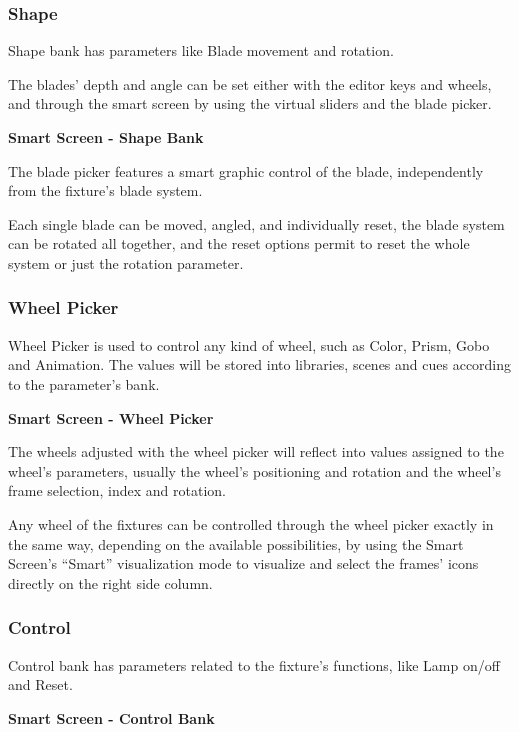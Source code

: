 \documentclass[
]{article}
\begin{document}
\hypertarget{shape}{%
\subsubsection{Shape}\label{shape}}

Shape bank has parameters like Blade movement and rotation.

The blades' depth and angle can be set either with the editor keys and wheels, and through the smart screen by using the virtual sliders and the blade picker.

\textbf{Smart Screen - Shape Bank}

The blade picker features a smart graphic control of the blade, independently from the fixture's blade system.

Each single blade can be moved, angled, and individually reset, the blade system can be rotated all together, and the reset options permit to reset the whole system or just the rotation parameter.

\hypertarget{wheel-picker}{%
\subsubsection{Wheel Picker}\label{wheel-picker}}

Wheel Picker is used to control any kind of wheel, such as Color, Prism, Gobo and Animation.
The values will be stored into libraries, scenes and cues according to the parameter's bank.

\textbf{Smart Screen - Wheel Picker}

The wheels adjusted with the wheel picker will reflect into values assigned to the wheel's parameters, usually the wheel's positioning and rotation and the wheel's frame selection, index and rotation.

Any wheel of the fixtures can be controlled through the wheel picker exactly in the same way, depending on the available possibilities, by using the Smart Screen's ``Smart'' visualization mode to visualize and select the frames' icons directly on the right side column.

\hypertarget{control}{%
\subsubsection{Control}\label{control}}

Control bank has parameters related to the fixture's functions, like Lamp on/off and Reset.

\textbf{Smart Screen - Control Bank}
\end{document}

